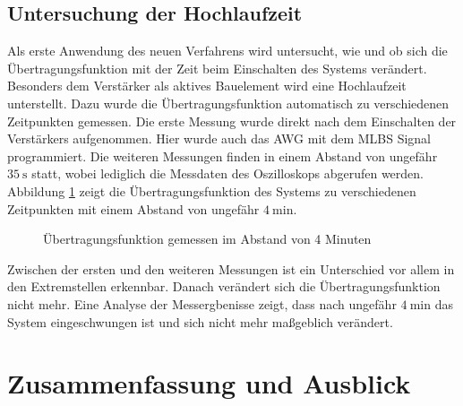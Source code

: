 \documentclass[12pt,report,final,twoside,accentcolor=tud9b,bigchapter]{tudreport}
\begin{document}
\section{Untersuchung der Hochlaufzeit}
Als erste Anwendung des neuen Verfahrens wird untersucht, wie und ob sich die Übertragungsfunktion mit der
Zeit beim Einschalten des Systems verändert. Besonders dem Verstärker
als aktives Bauelement wird eine Hochlaufzeit unterstellt. Dazu wurde die
Übertragungsfunktion automatisch zu verschiedenen Zeitpunkten gemessen.
Die erste Messung wurde direkt nach dem Einschalten der Verstärkers
aufgenommen. Hier wurde auch das AWG mit dem MLBS Signal programmiert.
Die weiteren Messungen finden in einem Abstand von ungefähr
$\SI{35}{\second}$ statt, wobei lediglich die Messdaten des Oszilloskops abgerufen werden.  Abbildung \ref{fig:vglzeit} zeigt die
Übertragungsfunktion des Systems zu verschiedenen Zeitpunkten mit einem
Abstand von ungefähr $\SI{4}{\minute}$.
\begin{figure}[t!]
\centering
{}
    \caption{Übertragungsfunktion gemessen im Abstand von 4 Minuten}
    \label{fig:vglzeit}
\end{figure}
Zwischen der ersten und den weiteren Messungen ist ein Unterschied vor
allem in den Extremstellen erkennbar. Danach verändert sich die
Übertragungsfunktion nicht mehr.
Eine Analyse der Messergbenisse zeigt, dass nach ungefähr
$\SI{4}{\minute}$ das System eingeschwungen ist und sich nicht mehr
maßgeblich verändert.

\chapter{Zusammenfassung und Ausblick}
\end{document}
